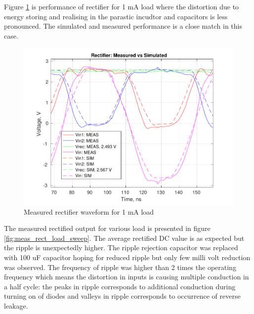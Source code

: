 \documentclass[UKenglish]{ifimaster}  %
\begin{document}
Figure \ref{fig:meas_rect_1ma} is performance of rectifier for 1 mA load where the distortion due to energy storing and 
realising in the parastic incudtor and capacitors is less pronounced. The simulated and measured performance is a close match 
in this case. \\

\begin{figure} [!htbp]
  \centering
  \includegraphics[width=\textwidth]{img/meas/rect_1ma.pdf} 
 \caption{Measured rectifier waveform for 1 mA load} 
\label{fig:meas_rect_1ma} 
\end{figure}

The measured rectified output for various load is presented in figure \ref{fig:meas_rect_load_sweep}. The average rectified 
DC value is as expected but the ripple is unexpectedly higher. The ripple rejection capacitor was replaced with 100 uF capacitor 
hoping for reduced ripple but only few milli volt reduction was observed.
The frequency of ripple was higher than 2 times the operating frequency which means the distortion in inputs is causing 
multiple conduction in a half cycle: the peaks in ripple corresponds to additional conduction during turning on of diodes and 
valleys in ripple corresponds to occurrence of reverse leakage.
\end{document}
